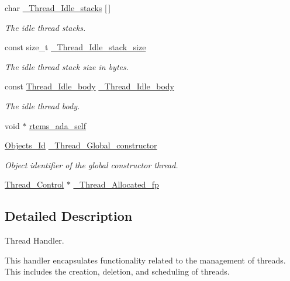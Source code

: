 \begin{DoxyCompactItemize}
char \mbox{\hyperlink{group__RTEMSScoreThread_gac8376902a32f888326684fc14078057c}{\+\_\+\+Thread\+\_\+\+Idle\+\_\+stacks}} \mbox{[}$\,$\mbox{]}
\begin{DoxyCompactList}\small\item\em The idle thread stacks. \end{DoxyCompactList}\item 
const size\+\_\+t \mbox{\hyperlink{group__RTEMSScoreThread_gacc61cd772951a83d83af82eba3ff4613}{\+\_\+\+Thread\+\_\+\+Idle\+\_\+stack\+\_\+size}}
\begin{DoxyCompactList}\small\item\em The idle thread stack size in bytes. \end{DoxyCompactList}\item 
const \mbox{\hyperlink{group__RTEMSScoreThread_ga45e6fd0b5cd35ee2ea9e36be90a84c1b}{Thread\+\_\+\+Idle\+\_\+body}} \mbox{\hyperlink{group__RTEMSScoreThread_ga7db3304111f98acc3634f7cc04dcff2f}{\+\_\+\+Thread\+\_\+\+Idle\+\_\+body}}
\begin{DoxyCompactList}\small\item\em The idle thread body. \end{DoxyCompactList}\item 
void $\ast$ \mbox{\hyperlink{group__RTEMSScoreThread_ga2b3416f9db9d594d76db105d8a7ad343}{rtems\+\_\+ada\+\_\+self}}
\item 
\mbox{\hyperlink{group__RTEMSScoreObject_ga5821f52a51072941bdd603e542d0863e}{Objects\+\_\+\+Id}} \mbox{\hyperlink{group__RTEMSScoreThread_ga547b3e17ad8dc24bd9e8385a89479174}{\+\_\+\+Thread\+\_\+\+Global\+\_\+constructor}}
\begin{DoxyCompactList}\small\item\em Object identifier of the global constructor thread. \end{DoxyCompactList}\item 
\mbox{\hyperlink{struct__Thread__Control}{Thread\+\_\+\+Control}} $\ast$ \mbox{\hyperlink{group__RTEMSScoreThread_ga87bfa1f152fd21a58c739c76cf260527}{\+\_\+\+Thread\+\_\+\+Allocated\+\_\+fp}}
\end{DoxyCompactItemize}


\subsection{Detailed Description}
Thread Handler. 

This handler encapsulates functionality related to the management of threads. This includes the creation, deletion, and scheduling of threads.


